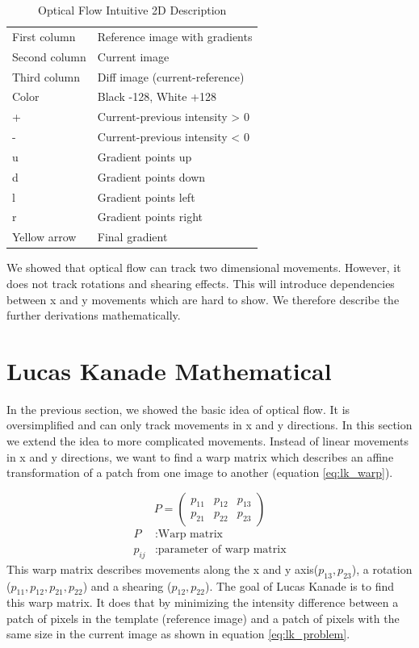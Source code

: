 \documentclass[11pt,a4paper,titlepage,oneside]{report}
\begin{document}
\begin{table}[H]
   \centering
   \begin{tabular}{l l}
       First column & Reference image with gradients\\
       Second column & Current image\\
       Third column & Diff image (current-reference)\\
       Color & Black -128, White +128\\
       + & Current-previous intensity > 0\\
       - & Current-previous intensity < 0\\
       u & Gradient points up\\
       d & Gradient points down\\
       l & Gradient points left\\
       r & Gradient points right\\
       Yellow arrow & Final gradient
  \end{tabular}
   \caption{Optical Flow Intuitive 2D Description}
  \label{tab:optical_flow_2d}
\end{table}

We showed that optical flow can track two dimensional movements. However, it does not track rotations and shearing effects. This will introduce dependencies between x and y movements which are hard to show. We therefore describe the further derivations mathematically.

\section{Lucas Kanade Mathematical}

In the previous section, we showed the basic idea of optical flow. It is oversimplified and can only track movements in x and y directions. In this section we extend the idea to more complicated movements. Instead of linear movements in x and y directions, we want to find a warp matrix which describes an affine transformation of a patch from one image to another (equation \ref{eq:lk_warp}).

\begin{equation}\label{eq:lk_warp}
  P=\begin{pmatrix}
    p_{11} & p_{12} & p_{13} \\
    p_{21} & p_{22} & p_{23}
  \end{pmatrix}
\end{equation}
\begin{align*}
  P       &:  \text{Warp matrix}\\
  p_{ij}  &:  \text{parameter of warp matrix}
\end{align*}
This warp matrix describes movements along the x and y axis($p_{13},p_{23}$), a rotation ($p_{11},p_{12},p_{21},p_{22}$) and a shearing ($p_{12},p_{22}$). The goal of Lucas Kanade is to find this warp matrix. It does that by minimizing the intensity difference between a patch of pixels in the template (reference image) and a patch of pixels with the same size in the current image as shown in equation \ref{eq:lk_problem}. 
\end{document}

